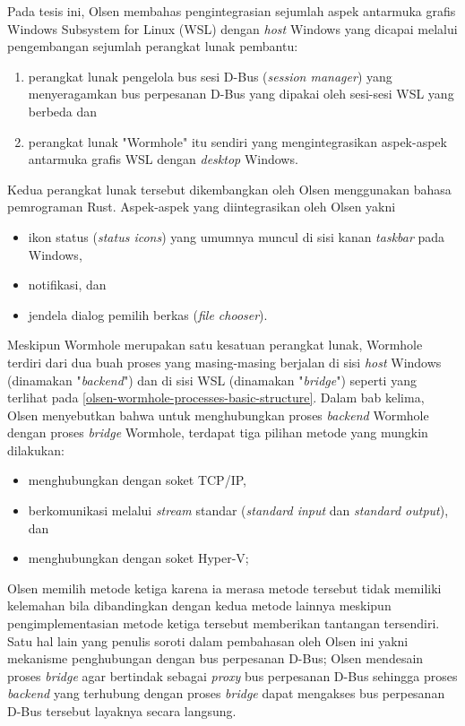 Pada tesis ini, Olsen membahas pengintegrasian sejumlah aspek antarmuka grafis Windows Subsystem for Linux (WSL) dengan \textit{host} Windows yang dicapai melalui pengembangan sejumlah perangkat lunak pembantu:
\begin{enumerate}
    \item perangkat lunak pengelola bus sesi D-Bus (\textit{session manager}) yang menyeragamkan bus perpesanan D-Bus yang dipakai oleh sesi-sesi WSL yang berbeda dan
    \item perangkat lunak "Wormhole" itu sendiri yang mengintegrasikan aspek-aspek antarmuka grafis WSL dengan \textit{desktop} Windows.
\end{enumerate}
Kedua perangkat lunak tersebut dikembangkan oleh Olsen menggunakan bahasa pemrograman Rust. Aspek-aspek yang diintegrasikan oleh Olsen yakni
\begin{itemize}
    \item ikon status (\textit{status icons}) yang umumnya muncul di sisi kanan \textit{taskbar} pada Windows,
    \item notifikasi, dan
    \item jendela dialog pemilih berkas (\textit{file chooser}).
\end{itemize}

Meskipun Wormhole merupakan satu kesatuan perangkat lunak, Wormhole terdiri dari dua buah proses yang masing-masing berjalan di sisi \textit{host} Windows (dinamakan "\textit{backend}") dan di sisi WSL (dinamakan "\textit{bridge}") seperti yang terlihat pada \autoref{olsen-wormhole-processes-basic-structure}. Dalam bab kelima, Olsen menyebutkan bahwa untuk menghubungkan proses \textit{backend} Wormhole dengan proses \textit{bridge} Wormhole, terdapat tiga pilihan metode yang mungkin dilakukan:
\begin{itemize}
    \item menghubungkan dengan soket TCP/IP,
    \item berkomunikasi melalui \textit{stream} standar (\textit{standard input} dan \textit{standard output}), dan
    \item menghubungkan dengan soket Hyper-V;
\end{itemize}
Olsen memilih metode ketiga karena ia merasa metode tersebut tidak memiliki kelemahan bila dibandingkan dengan kedua metode lainnya meskipun pengimplementasian metode ketiga tersebut memberikan tantangan tersendiri. Satu hal lain yang penulis soroti dalam pembahasan oleh Olsen ini yakni mekanisme penghubungan dengan bus perpesanan D-Bus; Olsen mendesain proses \textit{bridge} agar bertindak sebagai \textit{proxy} bus perpesanan D-Bus sehingga proses \textit{backend} yang terhubung dengan proses \textit{bridge} dapat mengakses bus perpesanan D-Bus tersebut layaknya secara langsung.

